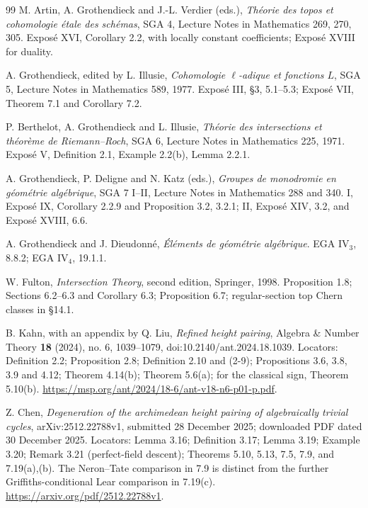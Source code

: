 \documentclass[11pt,a4paper]{article}
\theoremstyle{definition}
\theoremstyle{remark}
\begin{document}
\begin{thebibliography}{99}
M. Artin, A. Grothendieck and J.-L. Verdier (eds.),
\emph{Th\'eorie des topos et cohomologie \'etale des sch\'emas},
SGA 4, Lecture Notes in Mathematics 269, 270, 305.
Expos\'e XVI, Corollary 2.2, with locally constant coefficients;
Expos\'e XVIII for duality.

A. Grothendieck, edited by L. Illusie,
\emph{Cohomologie $\ell$-adique et fonctions $L$},
SGA 5, Lecture Notes in Mathematics 589, 1977.
Expos\'e III, \S3, 5.1--5.3;
Expos\'e VII, Theorem 7.1 and Corollary 7.2.

P. Berthelot, A. Grothendieck and L. Illusie,
\emph{Th\'eorie des intersections et th\'eor\`eme de
Riemann--Roch}, SGA 6, Lecture Notes in Mathematics 225, 1971.
Expos\'e V, Definition 2.1, Example 2.2(b), Lemma 2.2.1.

A. Grothendieck, P. Deligne and N. Katz (eds.),
\emph{Groupes de monodromie en g\'eom\'etrie alg\'ebrique},
SGA 7 I--II, Lecture Notes in Mathematics 288 and 340.
I, Expos\'e IX, Corollary 2.2.9 and Proposition 3.2,
3.2.1; II, Expos\'e XIV, 3.2,
and Expos\'e XVIII, 6.6.

A. Grothendieck and J. Dieudonn\'e,
\emph{\'El\'ements de g\'eom\'etrie alg\'ebrique}.
EGA IV$_3$, 8.8.2; EGA IV$_4$, 19.1.1.

W. Fulton, \emph{Intersection Theory}, second edition,
Springer, 1998.
Proposition 1.8; Sections 6.2--6.3 and Corollary 6.3;
Proposition 6.7; regular-section top Chern classes in \S14.1.



B. Kahn, with an appendix by Q. Liu,
\emph{Refined height pairing}, Algebra \& Number Theory \textbf{18}
(2024), no. 6, 1039--1079,
doi:10.2140/ant.2024.18.1039.
Locators: Definition 2.2; Proposition 2.8; Definition 2.10 and (2-9);
Propositions 3.6, 3.8, 3.9 and 4.12; Theorem 4.14(b);
Theorem 5.6(a); for the classical sign,
Theorem 5.10(b).
\url{https://msp.org/ant/2024/18-6/ant-v18-n6-p01-p.pdf}.

Z. Chen, \emph{Degeneration of the archimedean height pairing of
algebraically trivial cycles}, arXiv:2512.22788v1,
submitted 28 December 2025; downloaded PDF dated 30 December 2025.
Locators: Lemma 3.16; Definition 3.17; Lemma 3.19; Example 3.20;
Remark 3.21 (perfect-field descent);
Theorems 5.10, 5.13, 7.5, 7.9, and 7.19(a),(b).
The Neron--Tate comparison in 7.9 is distinct from the further
Griffiths-conditional Lear comparison in 7.19(c).
\url{https://arxiv.org/pdf/2512.22788v1}.


\end{thebibliography}
\end{document}
